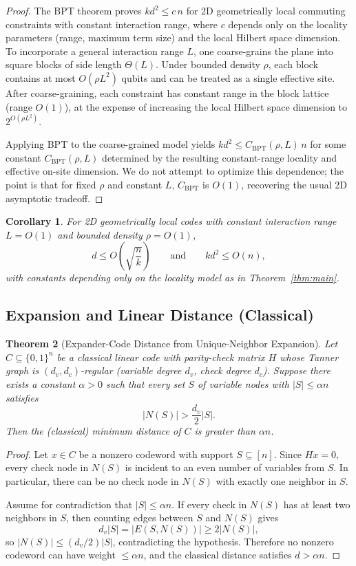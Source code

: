 \documentclass[11pt,a4paper]{article}
\newtheorem{theorem}{Theorem}[section]
\newtheorem{corollary}[theorem]{Corollary}
\theoremstyle{definition}
\theoremstyle{remark}
\begin{document}
\begin{proof}
The BPT theorem \cite{BPT} proves $k d^2 \le c\,n$ for 2D geometrically local commuting constraints with constant interaction range, where $c$ depends only on the locality parameters (range, maximum term size) and the local Hilbert space dimension. To incorporate a general interaction range $L$, one coarse-grains the plane into square blocks of side length $\Theta(L)$. Under bounded density $\rho$, each block contains at most $O(\rho L^2)$ qubits and can be treated as a single effective site. After coarse-graining, each constraint has constant range in the block lattice (range $O(1)$), at the expense of increasing the local Hilbert space dimension to $2^{O(\rho L^2)}$.

Applying BPT to the coarse-grained model yields $k d^2 \le C_{\mathrm{BPT}}(\rho,L)\, n$ for some constant $C_{\mathrm{BPT}}(\rho,L)$ determined by the resulting constant-range locality and effective on-site dimension. We do not attempt to optimize this dependence; the point is that for fixed $\rho$ and constant $L$, $C_{\mathrm{BPT}}$ is $O(1)$, recovering the usual 2D asymptotic tradeoff.
\end{proof}

\begin{corollary}
For 2D geometrically local codes with constant interaction range $L=O(1)$ and bounded density $\rho=O(1)$,
\[
d \le O\left(\sqrt{\frac{n}{k}}\right) \qquad\text{and}\qquad k d^2 \le O(n),
\]
with constants depending only on the locality model as in Theorem~\ref{thm:main}.
\end{corollary}


\subsection{Expansion and Linear Distance (Classical)}

\begin{theorem}[Expander-Code Distance from Unique-Neighbor Expansion]\label{thm:expander}
Let $C\subseteq \{0,1\}^n$ be a \emph{classical} linear code with parity-check matrix $H$ whose Tanner graph is $(d_v,d_c)$-regular (variable degree $d_v$, check degree $d_c$). Suppose there exists a constant $\alpha>0$ such that every set $S$ of variable nodes with $|S|\le \alpha n$ satisfies
\[
|N(S)| > \frac{d_v}{2}|S|.
\]
Then the (classical) minimum distance of $C$ is greater than $\alpha n$.
\end{theorem}

\begin{proof}
Let $x\in C$ be a nonzero codeword with support $S\subseteq [n]$. Since $Hx=0$, every check node in $N(S)$ is incident to an even number of variables from $S$. In particular, there can be no check node in $N(S)$ with exactly one neighbor in $S$.

Assume for contradiction that $|S|\le \alpha n$. If every check in $N(S)$ has at least two neighbors in $S$, then counting edges between $S$ and $N(S)$ gives
\[
d_v |S| = |E(S,N(S))| \ge 2|N(S)|,
\]
so $|N(S)|\le (d_v/2)|S|$, contradicting the hypothesis. Therefore no nonzero codeword can have weight $\le \alpha n$, and the classical distance satisfies $d>\alpha n$.
\end{proof}
\end{document}
